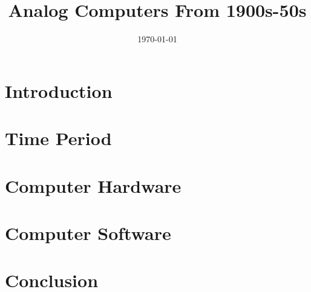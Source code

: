 \documentclass[11pt, twocolumn]{article}
\title{\LARGE \bf \thetitle \\
\large Analog Computers From 1900s-50s}
\author{\theauthor}
\date{\today}
\providecommand{\main}{.}  %
\def\biblio{}
\begin{document}
\def\biblio{}
\maketitle

\section{Introduction}


\section{Time Period}


\section{Computer Hardware}


\section{Computer Software}


\section{Conclusion}




\end{document}
